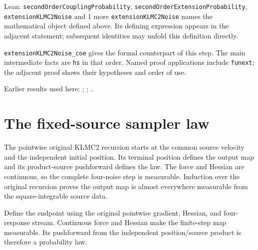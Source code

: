 \documentclass[11pt,a4paper]{article}
\begin{document}
\begin{leanbox}{Lean: \texttt{secondOrderCouplingProbability}, \texttt{secondOrderExtensionProbability}, \texttt{extensionKLMC2Noise} and 1 more}
\texttt{extension\allowbreak{}KLMC2\allowbreak{}Noise} names the mathematical object defined above. Its defining expression appears in the adjacent statement; subsequent identities may unfold this definition directly.




\texttt{extension\allowbreak{}KLMC2\allowbreak{}Noise\_\allowbreak{}coe} gives the formal counterpart of this step. The main intermediate facts are \texttt{hs} in that order. Named proof applications include \texttt{funext}; the adjacent proof shows their hypotheses and order of use.
\end{leanbox}


Earlier results used here: \cite[Section~3.17.1]{LangevinLean2026ULASC}; \cite[Section~3.22.2]{LangevinLean2026ULASC}; \cite[Section~3.22.3]{LangevinLean2026ULASC}.

\section{\texorpdfstring{The fixed-source sampler law}{The fixed-source sampler law}}


The pointwise original KLMC2 recursion starts at the common source velocity and the independent initial position. Its terminal position defines the output map and its product-source pushforward defines the law. The force and Hessian are continuous, so the complete four-noise step is measurable. Induction over the original recursion proves the output map is almost everywhere measurable from the square-integrable source data.



Define the endpoint using the original pointwise gradient, Hessian, and four-response stream. Continuous force and Hessian make the finite-step map measurable. Its pushforward from the independent position/\allowbreak{}source product is therefore a probability law.
\end{document}
